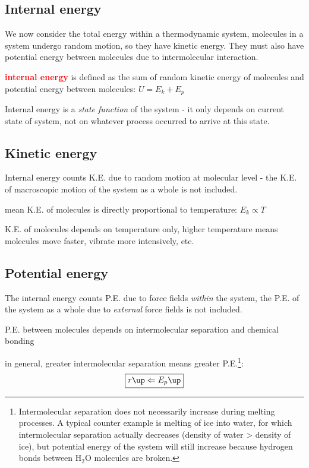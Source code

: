 \documentclass[a4paper,12pt]{book}
\newcounter{example}[chapter]
\newcommand{\cmt}{}
\newenvironment{ilight}
  {\centering
  	\vspace*{6pt}
  	\begin{tcolorbox}[colframe=Gray,colback=LightGrey!15]
  \setlength{\baselineskip}{\baselineskip}%
  }
  {\end{tcolorbox}\vspace*{-4pt}}
\newcommand{\keypoint}[1]{\textbf{\textcolor{red}{#1}}}
\newcommand{\tcbhighmath}[1]{\boxed{#1}}
\newcommand{\keypoint}[1]{\textbf{\textcolor{red}{#1}}}
\newcommand{\cmt}{}
\begin{document}
\subsection{Internal energy}

We now consider the total energy within a thermodynamic system, molecules in a system undergo random motion, so they have kinetic energy. They must also have potential energy between molecules due to intermolecular interaction.

\begin{ilight}
	\keypoint{internal energy} is defined as the sum of random kinetic energy of molecules and potential energy between molecules: $\tcbhighmath{U=E_k+E_p}$
\end{ilight}

Internal energy is a \emph{state function} of the system - it only depends on current state of system, not on whatever process occurred to arrive at this state.

\subsection{Kinetic energy}

Internal energy counts K.E. due to random motion at molecular level - the K.E. of macroscopic motion of the system as a whole is not included.

\cmt mean K.E. of molecules is directly proportional to temperature: $\tcbhighmath{E_k \propto T}$

K.E. of molecules depends on temperature only, higher temperature means molecules move faster, vibrate more intensively, etc.

\subsection{Potential energy}

The internal energy counts P.E. due to force fields \emph{within} the system, the P.E. of the system as a whole due to \emph{external} force fields is not included.

\cmt P.E. between molecules depends on intermolecular separation and chemical bonding

in general, greater intermolecular separation means greater P.E.\footnote{Intermolecular separation does not necessarily increase during melting processes. A typical counter example is melting of ice into water, for which intermolecular separation actually decreases (density of water > density of ice), but potential energy of the system will still increase because hydrogen bonds between H$_2$O molecules are broken.}: $$\tcbhighmath{r \up \Leftarrow E_p \up}$$
\end{document}
